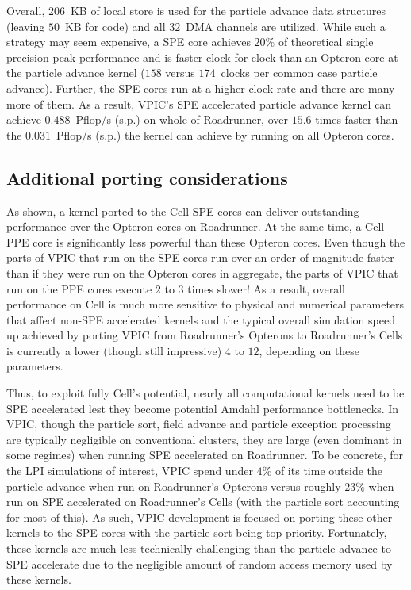 \documentclass[journal,twoside]{IEEEtran}
\begin{document}
Overall, $206$~KB of local store is used for the particle advance data
structures (leaving $50$~KB for code) and all $32$~DMA channels are
utilized.  While such a strategy may seem expensive, a SPE core
achieves $20\%$ of theoretical single precision peak performance and
is faster clock-for-clock than an Opteron core at the particle advance
kernel ($158$ versus $174$~clocks per common case particle advance).
Further, the SPE cores run at a higher clock rate and there are many
more of them.  As a result, VPIC's SPE accelerated particle advance
kernel can achieve $0.488$~Pflop/s (s.p.) on whole of Roadrunner, over
$15.6$ times faster than the $0.031$~Pflop/s (s.p.) the kernel can
achieve by running on all Opteron cores.

\subsection{Additional porting considerations}

As shown, a kernel ported to the Cell SPE cores can deliver
outstanding performance over the Opteron cores on Roadrunner.  At the
same time, a Cell PPE core is significantly less powerful than these
Opteron cores.  Even though the parts of VPIC that run on the SPE
cores run over an order of magnitude faster than if they were run on
the Opteron cores in aggregate, the parts of VPIC that run on the PPE
cores execute $2$ to $3$ times slower!  As a result, overall
performance on Cell is much more sensitive to physical and numerical
parameters that affect non-SPE accelerated kernels and the typical
overall simulation speed up achieved by porting VPIC from Roadrunner's
Opterons to Roadrunner's Cells is currently a lower (though still
impressive) $4$ to $12$, depending on these parameters.

Thus, to exploit fully Cell's potential, nearly all computational
kernels need to be SPE accelerated lest they become potential Amdahl
performance bottlenecks.  In VPIC, though the particle sort, field
advance and particle exception processing are typically negligible on
conventional clusters, they are large (even dominant in some regimes)
when running SPE accelerated on Roadrunner.  To be concrete, for the
LPI simulations of interest, VPIC spend under $4\%$ of its time
outside the particle advance when run on Roadrunner's Opterons versus
roughly $23\%$ when run on SPE accelerated on Roadrunner's Cells (with
the particle sort accounting for most of this).  As such, VPIC
development is focused on porting these other kernels to the SPE cores
with the particle sort being top priority.  Fortunately, these kernels
are much less technically challenging than the particle advance to SPE
accelerate due to the negligible amount of random access memory used
by these kernels.
\end{document}
